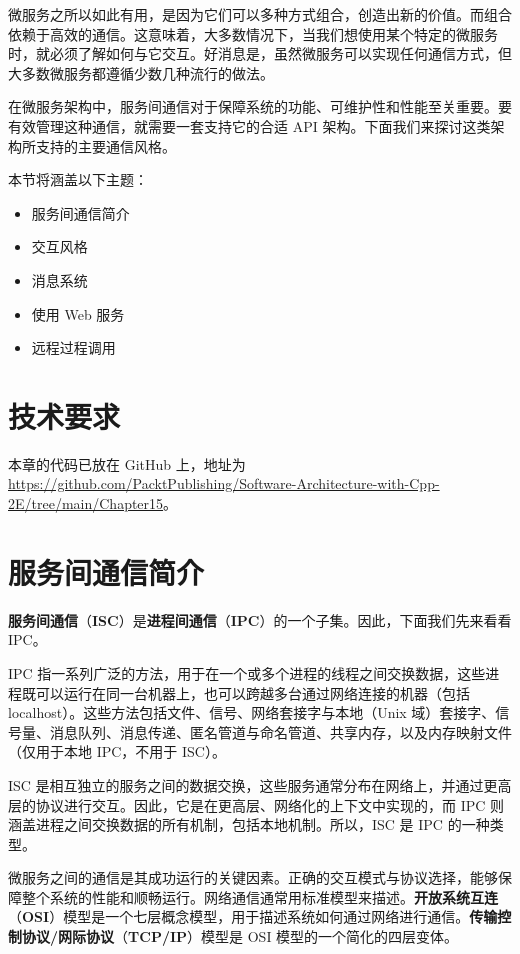 微服务之所以如此有用，是因为它们可以多种方式组合，创造出新的价值。而组合依赖于高效的通信。这意味着，大多数情况下，当我们想使用某个特定的微服务时，就必须了解如何与它交互。好消息是，虽然微服务可以实现任何通信方式，但大多数微服务都遵循少数几种流行的做法。

在微服务架构中，服务间通信对于保障系统的功能、可维护性和性能至关重要。要有效管理这种通信，就需要一套支持它的合适 API 架构。下面我们来探讨这类架构所支持的主要通信风格。

本节将涵盖以下主题：

\begin{itemize}
\item 服务间通信简介
\item 交互风格
\item 消息系统
\item 使用 Web 服务
\item 远程过程调用
\end{itemize}

\section{技术要求}

本章的代码已放在 GitHub 上，地址为 \href{https://github.com/PacktPublishing/Software-Architecture-with-Cpp-2E/tree/main/Chapter15}{https://github.com/PacktPublishing/Software-Architecture-with-Cpp-2E/tree/main/Chapter15}。

\section{服务间通信简介}

\label{idx:1482}
\textbf{服务间通信}（\textbf{ISC}）是\textbf{进程间通信}（\textbf{IPC}）的一个子集。因此，下面我们先来看看 IPC。

\label{idx:1483}
IPC 指一系列广泛的方法，用于在一个或多个进程的线程之间交换数据，这些进程既可以运行在同一台机器上，也可以跨越多台通过网络连接的机器（包括 localhost）。这些方法包括文件、信号、网络套接字与本地（Unix 域）套接字、信号量、消息队列、消息传递、匿名管道与命名管道、共享内存，以及内存映射文件（仅用于本地 IPC，不用于 ISC）。

ISC 是相互独立的服务之间的数据交换，这些服务通常分布在网络上，并通过更高层的协议进行交互。因此，它是在更高层、网络化的上下文中实现的，而 IPC 则涵盖进程之间交换数据的所有机制，包括本地机制。所以，ISC 是 IPC 的一种类型。

\label{idx:1484}
\label{idx:1485}
\label{idx:1486}
微服务之间的通信是其成功运行的关键因素。正确的交互模式与协议选择，能够保障整个系统的性能和顺畅运行。网络通信通常用标准模型来描述。\textbf{开放系统互连}（\textbf{OSI}）模型是一个七层概念模型，用于描述系统如何通过网络进行通信。\textbf{传输控制协议/网际协议}（\textbf{TCP/IP}）模型是 OSI 模型的一个简化的四层变体。

